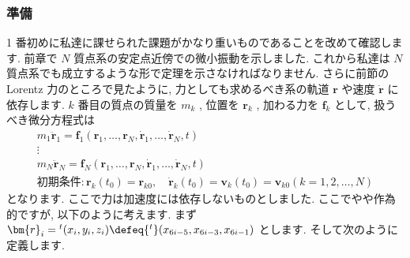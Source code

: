\documentclass[openany, a4paper, oneside]{jsbook}
\begin{document}
\subsubsection{準備}

1 番初めに私達に課せられた課題がかなり重いものであることを改めて確認します.
前章で $N$ 質点系の安定点近傍での微小振動を示しました.
これから私達は $N$ 質点系でも成立するような形で定理を示さなければなりません.
さらに前節の Lorentz 力のところで見たように,
力としても求めるべき系の軌道 $\bm{r}$ や速度 $\dot{ \bm{r} }$ に依存します.
$k$ 番目の質点の質量を $m_k$ , 位置を $\bm{r}_k$ , 加わる力を $\bm{f}_k$ として, 扱うべき微分方程式は
\begin{gather}
m_1 \ddot{ \bm{r} }_1 = \bm{f}_1 ( \bm{r}_1, \dots , \bm{r}_N , \dot{ \bm{r} }_1 , \dots , \dot{ \bm{r} }_N , t)\\
\vdots \\
m_N \ddot{ \bm{r} }_N = \bm{f}_N ( \bm{r}_1, \dots , \bm{r}_N , \dot{ \bm{r} }_1 , \dots , \dot{ \bm{r} }_N , t )\\
\text{初期条件}:
\bm{r}_k (t_0) = \bm{r}_{k0}
, \quad
\dot{ \bm{r} }_k (t_0) = \bm{v}_k ( t_0 ) = \bm{v}_{k0}
( k = 1 , 2 , \dots , N )
\end{gather}
となります.
ここで力は加速度には依存しないものとしました.
ここでやや作為的ですが, 以下のように考えます.
まず $\bm{r}_i = {^t}( x_i , y_i , z_i ) \defeq {^t} ( x_{6i-5} , x_{6i-3} , x_{6i-1} )$ とします.
そして次のように定義します.
\end{document}
